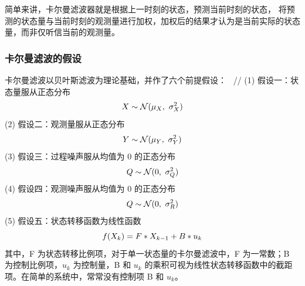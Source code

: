 \documentclass[12pt]{ctexart}
\begin{document}
\par
简单来讲，卡尔曼滤波器就是根据上一时刻的状态，预测当前时刻的状态，
将预测的状态量与当前时刻的观测量进行加权，加权后的结果才认为是当前实际的状态量，而非仅听信当前的观测量。

\subsubsection{卡尔曼滤波的假设}
卡尔曼滤波以贝叶斯滤波为理论基础，并作了六个前提假设：
~//
(1) 假设一：状态量服从正态分布
\[
X \sim \mathcal{N}(\mu_X, \ \sigma_X^2) \\
\]
(2) 假设二：观测量服从正态分布
\[
Y \sim \mathcal{N}(\mu_Y, \ \sigma_Y^2) \\
\]
(3) 假设三：过程噪声服从均值为 0 的正态分布
\[
Q \sim \mathcal{N}(0, \ \sigma_Q^2) \\
\]
(4) 假设四：观测噪声服从均值为 0 的正态分布
\[
Q \sim \mathcal{N}(0, \ \sigma_R^2) \\
\]
(5) 假设五：状态转移函数为线性函数
\[
f(X_k)=F*X_{k-1}+B*u_k \\
\]
其中，F 为状态转移比例项，对于单一状态量的卡尔曼滤波中，F 为一常数；B 为控制比例项，$u_k$ 为控制量，B 和 $u_k$ 的乘积可视为线性状态转移函数中的截距项。在简单的系统中，常常没有控制项 B 和 $u_k$。
\end{document}
